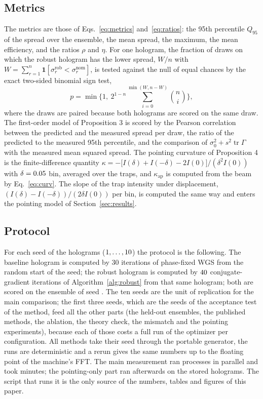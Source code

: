 \subsection{Metrics}

The metrics are those of Eqs.~\eqref{eq:metrics} and~\eqref{eq:ratios}: the 95th percentile $Q_{95}$ of the spread over the ensemble, the mean spread, the maximum, the mean efficiency, and the ratios $\rho$ and $\eta$. For one hologram, the fraction of draws on which the robust hologram has the lower spread, $W/n$ with $W=\sum_{r=1}^n\mathbf 1[\sigma_r^{\mathrm{rob}}<\sigma_r^{\mathrm{nom}}]$, is tested against the null of equal chances by the exact two-sided binomial sign test,
\begin{equation}
p=\min\Big\{1,\ 2^{1-n}\sum_{i=0}^{\min(W,n-W)}\binom ni\Big\},\label{eq:sign}
\end{equation}
where the draws are paired because both holograms are scored on the same draw. The first-order model of Proposition 3 is scored by the Pearson correlation between the predicted and the measured spread per draw, the ratio of the predicted to the measured 95th percentile, and the comparison of $\sigma_0^2+s^2\operatorname{tr}\Gamma$ with the measured mean squared spread. The pointing curvature of
Proposition 4 is the finite-difference quantity $\kappa=-\big[I(\delta)+I(-\delta)-2I(0)\big]/(\delta^2I(0))$ with $\delta=0.05{}$ bin, averaged over the traps, and $\kappa_{\mathrm{ap}}$ is computed from the beam by Eq.~\eqref{eq:curv}. The slope of the trap intensity under displacement, $(I(\delta)-I(-\delta))/(2\delta I(0))$ per bin, is computed the same way and enters the pointing model of Section~\ref{sec:results}.

\subsection{Protocol}

For each seed of the holograms ($1,\dots,10$) the protocol is the following. The baseline hologram is computed by 30 iterations of phase-fixed WGS from the random start of the seed; the robust hologram is computed by $40$ conjugate-gradient iterations of Algorithm~\ref{alg:robust} from that same hologram; both are scored on the ensemble of seed \parEnsSeed. The ten seeds are the unit of replication for the main comparison; the first three
seeds, which are the seeds of the acceptance test of the method, feed all the other parts (the held-out ensembles, the published methods, the ablation, the theory check, the mismatch and the pointing experiments), because each of those costs a full run of the optimizer per configuration. All methods take their seed through the portable generator, the runs are deterministic and a rerun gives the same numbers up to the floating point of the machine's FFT.
The main measurement ran \workersUsed{} processes in parallel and took \totalMinutes{} minutes; the pointing-only part ran afterwards on the stored holograms. The script that runs it is the only source of the numbers, tables and figures of this paper.

